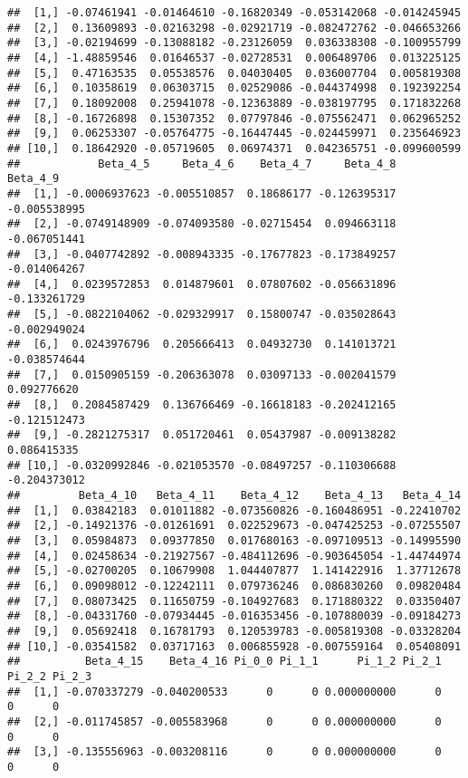 \documentclass[
]{article}
\begin{document}
\begin{verbatim}
##  [1,] -0.07461941 -0.01464610 -0.16820349 -0.053142068 -0.014245945
##  [2,]  0.13609893 -0.02163298 -0.02921719 -0.082472762 -0.046653266
##  [3,] -0.02194699 -0.13088182 -0.23126059  0.036338308 -0.100955799
##  [4,] -1.48859546  0.01646537 -0.02728531  0.006489706  0.013225125
##  [5,]  0.47163535  0.05538576  0.04030405  0.036007704  0.005819308
##  [6,]  0.10358619  0.06303715  0.02529086 -0.044374998  0.192392254
##  [7,]  0.18092008  0.25941078 -0.12363889 -0.038197795  0.171832268
##  [8,] -0.16726898  0.15307352  0.07797846 -0.075562471  0.062965252
##  [9,]  0.06253307 -0.05764775 -0.16447445 -0.024459971  0.235646923
## [10,]  0.18642920 -0.05719605  0.06974371  0.042365751 -0.099600599
##            Beta_4_5     Beta_4_6    Beta_4_7     Beta_4_8     Beta_4_9
##  [1,] -0.0006937623 -0.005510857  0.18686177 -0.126395317 -0.005538995
##  [2,] -0.0749148909 -0.074093580 -0.02715454  0.094663118 -0.067051441
##  [3,] -0.0407742892 -0.008943335 -0.17677823 -0.173849257 -0.014064267
##  [4,]  0.0239572853  0.014879601  0.07807602 -0.056631896 -0.133261729
##  [5,] -0.0822104062 -0.029329917  0.15800747 -0.035028643 -0.002949024
##  [6,]  0.0243976796  0.205666413  0.04932730  0.141013721 -0.038574644
##  [7,]  0.0150905159 -0.206363078  0.03097133 -0.002041579  0.092776620
##  [8,]  0.2084587429  0.136766469 -0.16618183 -0.202412165 -0.121512473
##  [9,] -0.2821275317  0.051720461  0.05437987 -0.009138282  0.086415335
## [10,] -0.0320992846 -0.021053570 -0.08497257 -0.110306688 -0.204373012
##         Beta_4_10   Beta_4_11    Beta_4_12    Beta_4_13   Beta_4_14
##  [1,]  0.03842183  0.01011882 -0.073560826 -0.160486951 -0.22410702
##  [2,] -0.14921376 -0.01261691  0.022529673 -0.047425253 -0.07255507
##  [3,]  0.05984873  0.09377850  0.017680163 -0.097109513 -0.14995590
##  [4,]  0.02458634 -0.21927567 -0.484112696 -0.903645054 -1.44744974
##  [5,] -0.02700205  0.10679908  1.044407877  1.141422916  1.37712678
##  [6,]  0.09098012 -0.12242111  0.079736246  0.086830260  0.09820484
##  [7,]  0.08073425  0.11650759 -0.104927683  0.171880322  0.03350407
##  [8,] -0.04331760 -0.07934445 -0.016353456 -0.107880039 -0.09184273
##  [9,]  0.05692418  0.16781793  0.120539783 -0.005819308 -0.03328204
## [10,] -0.03541582  0.03717163  0.006855928 -0.007559164  0.05408091
##          Beta_4_15    Beta_4_16 Pi_0_0 Pi_1_1      Pi_1_2 Pi_2_1 Pi_2_2 Pi_2_3
##  [1,] -0.070337279 -0.040200533      0      0 0.000000000      0      0      0
##  [2,] -0.011745857 -0.005583968      0      0 0.000000000      0      0      0
##  [3,] -0.135556963 -0.003208116      0      0 0.000000000      0      0      0

\end{verbatim}
\end{document}
